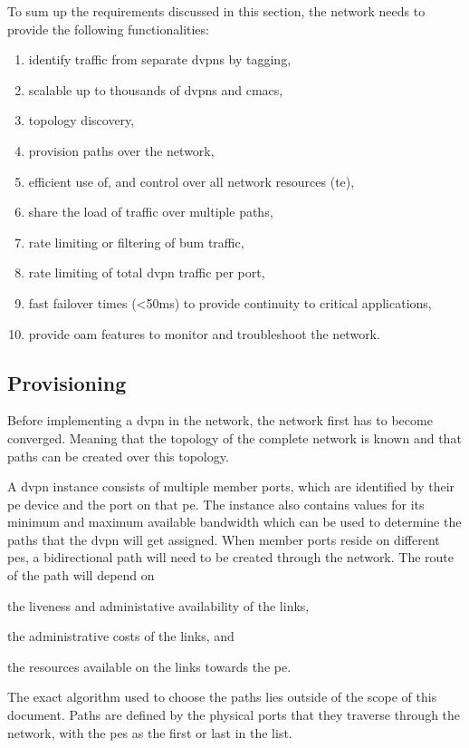 To sum up the requirements discussed in this section, the network needs to provide the following functionalities:

\begin{enumerate}
	\item identify traffic from separate \acp{dvpn} by tagging, 
	\item scalable up to thousands of \acp{dvpn} and \acsp{cmac},
	\item topology discovery, 
	\item provision paths over the network,
	\item efficient use of, and control over all network resources (\ac{te}),
	\item share the load of traffic over multiple paths,
	\item rate limiting or filtering of \ac{bum} traffic,
	\item rate limiting of total \ac{dvpn} traffic per port,
	\item fast failover times (<50ms) to provide continuity to critical applications,
	\item provide \acl{oam} features to monitor and troubleshoot the network.
\end{enumerate}



\subsection{Provisioning} %
\label{sub:provisioning}

Before implementing a \ac{dvpn} in the network, the network first has to become converged. Meaning that the topology of the complete network is known and that paths can be created over this topology. 

A \ac{dvpn} instance consists of multiple member ports, which are identified by their \ac{pe} device and the port on that \ac{pe}. The instance also contains values for its minimum and maximum available bandwidth which can be used to determine the paths that the \ac{dvpn} will get assigned. When member ports reside on different \acp{pe}, a bidirectional path will need to be created through the network. The route of the path will depend on 
\begin{inparaenum}
	\item the liveness and administative availability of the links, 
	\item the administrative costs of the links, and 
	\item the resources available on the links towards the \ac{pe}.
\end{inparaenum}
The exact algorithm used to choose the paths lies outside of the scope of this document. Paths are defined by the physical ports that they traverse through the network, with the \acp{pe} as the first or last in the list.

